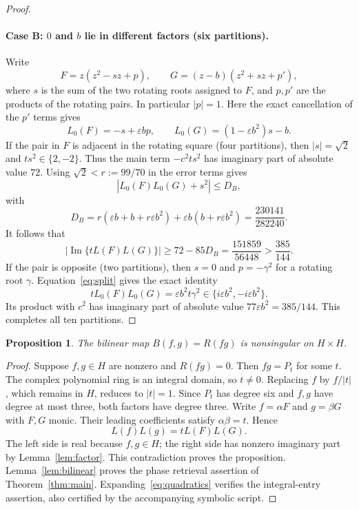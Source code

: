 \documentclass[11pt]{article}
\newtheorem{proposition}[theorem]{Proposition}
\theoremstyle{remark}\newtheorem{remark}[theorem]{Remark}
\newcommand{\im}{\operatorname{Im}}\newcommand{\re}{\operatorname{Re}}
\begin{document}
\begin{proof}
\paragraph{Case B: $0$ and $b$ lie in different factors (six partitions).}
Write
\[
 F=z(z^2-sz+p),\qquad G=(z-b)(z^2+sz+p'),
\]
where $s$ is the sum of the two rotating roots assigned to $F$, and $p,p'$ are the products of the rotating pairs. In particular $|p|=1$. Here the exact cancellation of the $p'$ terms gives
\begin{equation}\label{eq:split}
 L_0(F)=-s+\varepsilon bp,
 \qquad L_0(G)=(1-\varepsilon b^2)s-b.
\end{equation}
If the pair in $F$ is adjacent in the rotating square (four partitions), then $|s|=\sqrt2$ and $ts^2\in\{2,-2\}$. Thus the main term $-c^2ts^2$ has imaginary part of absolute value $72$. Using $\sqrt2<r:=99/70$ in the error terms gives
\[
 |L_0(F)L_0(G)+s^2|\le D_B,
\]
with
\[
 D_B=r(\varepsilon b+b+r\varepsilon b^2)
      +\varepsilon b(b+r\varepsilon b^2)
     =\frac{230141}{282240}.
\]
It follows that
\[
 |\im\{tL(F)L(G)\}|\ge72-85D_B
 =\frac{151859}{56448}>\frac{385}{144}.
\]
If the pair is opposite (two partitions), then $s=0$ and $p=-\gamma^2$ for a rotating root $\gamma$. Equation~\eqref{eq:split} gives the exact identity
\[
 tL_0(F)L_0(G)=\varepsilon b^2t\gamma^2\in
 \{i\varepsilon b^2,-i\varepsilon b^2\}.
\]
Its product with $c^2$ has imaginary part of absolute value
$77\varepsilon b^2=385/144$. This completes all ten partitions.
\end{proof}

\begin{proposition}\label{prop:ns}
The bilinear map $B(f,g)=R(fg)$ is nonsingular on $H\times H$.
\end{proposition}
\begin{proof}
Suppose $f,g\in H$ are nonzero and $R(fg)=0$. Then $fg=P_t$ for some $t$. The complex polynomial ring is an integral domain, so $t\ne0$. Replacing $f$ by $f/|t|$, which remains in $H$, reduces to $|t|=1$. Since $P_t$ has degree six and $f,g$ have degree at most three, both factors have degree three. Write $f=\alpha F$ and $g=\beta G$ with $F,G$ monic. Their leading coefficients satisfy $\alpha\beta=t$. Hence
\[
 L(f)L(g)=tL(F)L(G).
\]
The left side is real because $f,g\in H$; the right side has nonzero imaginary part by Lemma~\ref{lem:factor}. This contradiction proves the proposition. Lemma~\ref{lem:bilinear} proves the phase retrieval assertion of Theorem~\ref{thm:main}. Expanding~\eqref{eq:quadratics} verifies the integral-entry assertion, also certified by the accompanying symbolic script.
\end{proof}
\end{document}
